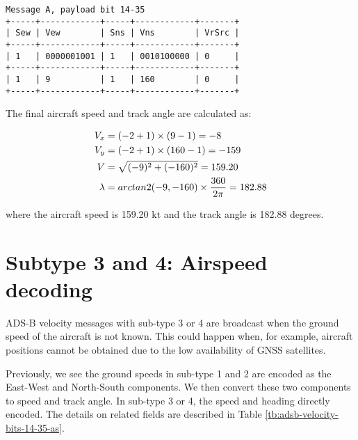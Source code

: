 \begin{verbatim}
Message A, payload bit 14-35
+-----+------------+-----+------------+-------+
| Sew | Vew        | Sns | Vns        | VrSrc |
+-----+------------+-----+------------+-------+
| 1   | 0000001001 | 1   | 0010100000 | 0     |
+-----+------------+-----+------------+-------+
| 1   | 9          | 1   | 160        | 0     |
+-----+------------+-----+------------+-------+
\end{verbatim}

The final aircraft speed and track angle are calculated as:

\begin{align}
  V_x &= (-2\time1 + 1) \times (9 - 1)  = -8 \\
  V_y &= (-2\time1 + 1) \times (160 - 1) = -159 \\
  V &= \sqrt{(-9)^2+ (-160)^2} = 159.20 \\
  \lambda &= arctan2(-9, -160) \times \frac{360}{2\pi} = 182.88
\end{align}

where the aircraft speed is 159.20 kt and the track angle is 182.88 degrees.


\section{Subtype 3 and 4: Airspeed decoding}

ADS-B velocity messages with sub-type 3 or 4 are broadcast when the ground speed of the aircraft is not known. This could happen when, for example, aircraft positions cannot be obtained due to the low availability of GNSS satellites.

Previously, we see the ground speeds in sub-type 1 and 2 are encoded as the East-West and North-South components. We then convert these two components to speed and track angle. In sub-type 3 or 4, the speed and heading directly encoded. The details on related fields are described in Table \ref{tb:adsb-velocity-bits-14-35-as}.

